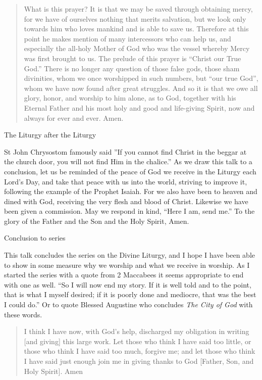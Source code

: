 \documentclass[
]{article}
\newcommand{\RL}[1]{\beginR #1\endR}
\begin{document}
\begin{quote}
What is this prayer? It is that we may be saved through obtaining mercy,
for we have of ourselves nothing that merits salvation, but we look only
towards him who loves mankind and is able to save us. Therefore at this
point he makes mention of many intercessors who can help us, and
especially the all-holy Mother of God who was the vessel whereby Mercy
was first brought to us. The prelude of this prayer is ``Christ our True
God.'' There is no longer any question of those false gods, those sham
divinities, whom we once worshipped in such numbers, but ``our true
God'', whom we have now found after great struggles. And so it is that
we owe all glory, honor, and worship to him alone, as to God, together
with his Eternal Father and his most holy and good and life-giving
Spirit, now and always for ever and ever. Amen.
\end{quote}

The Liturgy after the Liturgy

St John Chrysostom famously said \RL{''}If you cannot find Christ in the
beggar at the church door, you will not find Him in the chalice.'' As we
draw this talk to a conclusion, let us be reminded of the peace of God
we receive in the Liturgy each Lord's Day, and take that peace with us
into the world, striving to improve it, following the example of the
Prophet Isaiah. For we also have been to heaven and dined with God,
receiving the very flesh and blood of Christ. Likewise we have been
given a commission. May we respond in kind, ``Here I am, send me.'' To
the glory of the Father and the Son and the Holy Spirit, Amen.

Conclusion to series

This talk concludes the series on the Divine Liturgy, and I hope I have
been able to show in some measure why we worship and what we receive in
worship. As I started the series with a quote from 2 Maccabees it seems
appropriate to end with one as well. ``So I will now end my story. If it
is well told and to the point, that is what I myself desired; if it is
poorly done and mediocre, that was the best I could do.'' Or to quote
Blessed Augustine who concludes \emph{The City of God} with these words.

\begin{quote}
I think I have now, with God's help, discharged my obligation in writing
{[}and giving{]} this large work. Let those who think I have said too
little, or those who think I have said too much, forgive me; and let
those who think I have said just enough join me in giving thanks to God
{[}Father, Son, and Holy Spirit{]}. Amen
\end{quote}
\end{document}
